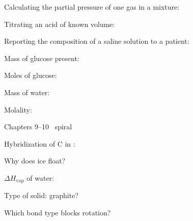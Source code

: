 \documentclass{apchem-worksheet}
\begin{document}
\begin{parts}
  \item Calculating the partial pressure of one gas in a mixture:
  \item Titrating an acid of known volume:
  \item Reporting the composition of a saline solution to a patient:
\end{parts}

\begin{parts}
  \item Mass of glucose present: 
  \item Moles of glucose: 
  \item Mass of water: 
  \item Molality: 
\end{parts}

\begin{spiralstrip}{Chapters 9--10 \textbullet\ spiral}
  \item Hybridization of C in : 
  \item Why does ice float? 
  \item $\Delta H_{\text{vap}}$ of water:
  \item Type of solid: graphite? 
  \item Which bond type blocks rotation? \answerblank[1.8cm]{$\pi$}
\end{spiralstrip}
\end{document}
